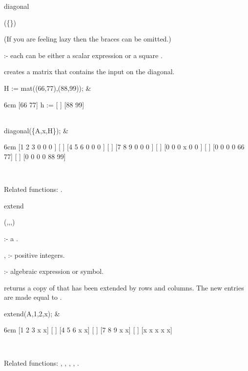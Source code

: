 \begin{Operator}{diagonal}

\begin{Syntax}
(\{\}) 
\end{Syntax}
(If you are feeling lazy then the braces can be omitted.)

 :- each can be either a scalar expression or a 
square . 

 creates a matrix that contains the input on the 
diagonal.

\begin{Examples}

H := mat((66,77),(88,99)); &
\begin{multilineoutput}{6cm}
     [66  77]
h := [      ]
     [88  99]
\end{multilineoutput} \\

diagonal(\{A,x,H\}); &
\begin{multilineoutput}{6cm}
[1  2  3  0  0   0 ]
[                  ]
[4  5  6  0  0   0 ]
[                  ]
[7  8  9  0  0   0 ]
[                  ]
[0  0  0  x  0   0 ]
[                  ]
[0  0  0  0  66  77]
[                  ]
[0  0  0  0  88  99]
\end{multilineoutput} \\

\end{Examples}

Related functions: 
.

\end{Operator}


\begin{Operator}{extend}

\begin{Syntax}
(,,,)
\end{Syntax}

            :- a . 

,        :- positive integers. 

              :- algebraic expression or symbol.

 returns a copy of  that has been extended by 
 rows and  columns. The new entries are made equal to 
.

\begin{Examples}

extend(A,1,2,x); &
\begin{multilineoutput}{6cm}
[1  2  3  x  x]
[             ]
[4  5  6  x  x]
[             ]
[7  8  9  x  x]
[             ]
[x  x  x  x  x]
\end{multilineoutput} \\

\end{Examples}

Related functions: 
, , ,  
, .

\end{Operator}


